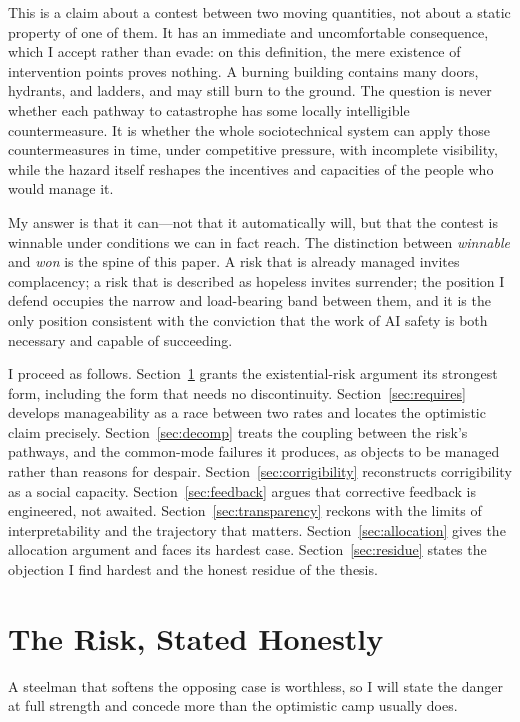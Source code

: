 \documentclass[11pt]{article}
\begin{document}
This is a claim about a contest between two moving quantities, not about a static property of one of them. It has an immediate and uncomfortable consequence, which I accept rather than evade: on this definition, the mere existence of intervention points proves nothing. A burning building contains many doors, hydrants, and ladders, and may still burn to the ground. The question is never whether each pathway to catastrophe has some locally intelligible countermeasure. It is whether the whole sociotechnical system can apply those countermeasures in time, under competitive pressure, with incomplete visibility, while the hazard itself reshapes the incentives and capacities of the people who would manage it.

My answer is that it can---not that it automatically will, but that the contest is winnable under conditions we can in fact reach. The distinction between \emph{winnable} and \emph{won} is the spine of this paper. A risk that is already managed invites complacency; a risk that is described as hopeless invites surrender; the position I defend occupies the narrow and load-bearing band between them, and it is the only position consistent with the conviction that the work of AI safety is both necessary and capable of succeeding.

I proceed as follows. Section~\ref{sec:risk} grants the existential-risk argument its strongest form, including the form that needs no discontinuity. Section~\ref{sec:requires} develops manageability as a race between two rates and locates the optimistic claim precisely. Section~\ref{sec:decomp} treats the coupling between the risk's pathways, and the common-mode failures it produces, as objects to be managed rather than reasons for despair. Section~\ref{sec:corrigibility} reconstructs corrigibility as a social capacity. Section~\ref{sec:feedback} argues that corrective feedback is engineered, not awaited. Section~\ref{sec:transparency} reckons with the limits of interpretability and the trajectory that matters. Section~\ref{sec:allocation} gives the allocation argument and faces its hardest case. Section~\ref{sec:residue} states the objection I find hardest and the honest residue of the thesis.

\section{The Risk, Stated Honestly}
\label{sec:risk}

A steelman that softens the opposing case is worthless, so I will state the danger at full strength and concede more than the optimistic camp usually does.
\end{document}
